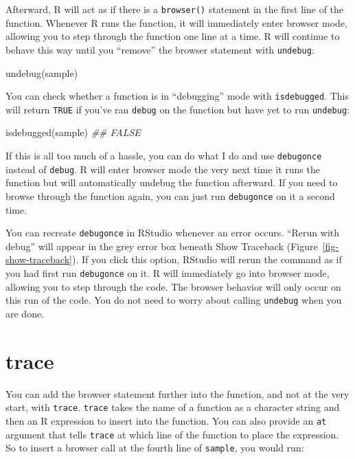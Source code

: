 \documentclass[
  letterpaper,
  DIV=11,
  numbers=noendperiod]{scrbook}
\newenvironment{Shaded}{\begin{snugshade}}{\end{snugshade}}
\newcommand{\DocumentationTok}[1]{\textcolor[rgb]{0.37,0.37,0.37}{\textit{#1}}}
\newcommand{\FunctionTok}[1]{\textcolor[rgb]{0.28,0.35,0.67}{#1}}
\newcommand{\NormalTok}[1]{\textcolor[rgb]{0.00,0.23,0.31}{#1}}
\begin{document}
Afterward, R will act as if there is a \texttt{browser()} statement in
the first line of the function. Whenever R runs the function, it will
immediately enter browser mode, allowing you to step through the
function one line at a time. R will continue to behave this way until
you ``remove'' the browser statement with \texttt{undebug}:

\begin{Shaded}
\begin{Highlighting}[]
\FunctionTok{undebug}\NormalTok{(sample)}
\end{Highlighting}
\end{Shaded}

You can check whether a function is in ``debugging'' mode with
\texttt{isdebugged}. This will return \texttt{TRUE} if you've ran
\texttt{debug} on the function but have yet to run \texttt{undebug}:

\begin{Shaded}
\begin{Highlighting}[]
\FunctionTok{isdebugged}\NormalTok{(sample)}
\DocumentationTok{\#\# FALSE}
\end{Highlighting}
\end{Shaded}

If this is all too much of a hassle, you can do what I do and use
\texttt{debugonce} instead of \texttt{debug}. R will enter browser mode
the very next time it runs the function but will automatically undebug
the function afterward. If you need to browse through the function
again, you can just run \texttt{debugonce} on it a second time.

You can recreate \texttt{debugonce} in RStudio whenever an error occurs.
``Rerun with debug'' will appear in the grey error box beneath Show
Traceback (Figure~\ref{fig-show-traceback}). If you click this option,
RStudio will rerun the command as if you had first run
\texttt{debugonce} on it. R will immediately go into browser mode,
allowing you to step through the code. The browser behavior will only
occur on this run of the code. You do not need to worry about calling
\texttt{undebug} when you are done.

\section{trace}\label{trace}

You can add the browser statement further into the function, and not at
the very start, with \texttt{trace}. \texttt{trace} takes the name of a
function as a character string and then an R expression to insert into
the function. You can also provide an \texttt{at} argument that tells
\texttt{trace} at which line of the function to place the expression. So
to insert a browser call at the fourth line of \texttt{sample}, you
would run:
\end{document}
